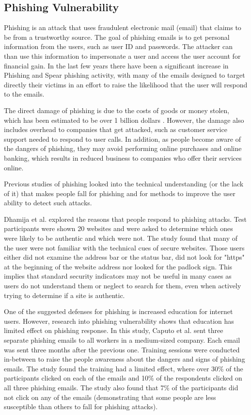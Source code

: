 \documentclass{sig-alternate}
\begin{document}
\subsection{Phishing Vulnerability} 




Phishing is an attack that uses fraudulent electronic mail (email) that claims to be from a trustworthy source.
The goal of phishing emails is to get personal information from the users, such as user ID and passwords. The attacker can than use this information to impersonate a user and access the user account for financial gain. 
In the last few years there have been a significant increase in Phishing and Spear phishing activity, with many of the emails designed to target directly their victims in an effort to raise the likelihood that the user will respond to the emails.

The direct damage of phishing 
is due to
the costs of goods or money stolen,
which has been estimated to be over 1 billion dollars \cite{JM06}. However, the damage 
also
includes overhead to companies that get attacked, such as customer service support needed to respond to user calls. In addition, as people become aware of the dangers of phishing, they may avoid performing online purchases and online banking, which results in reduced business to companies who offer their services online.

Previous studies of phishing looked into the technical understanding (or the lack of it) that makes people fall for phishing and for methods to improve the user ability to detect such attacks.

Dhamija et al. \cite{DTH06}
explored
the reasons that people respond to phishing attacks.
Test participants were shown 20 websites and were asked to determine which ones were likely to be authentic and which were not. The study found that many of the user were not familiar with the technical cues of secure websites. 
Those
users either did not examine the address bar or the status bar, did not look for "https" at the beginning of the website address nor looked for the padlock sign. This implies that standard security indicators may not be useful in many cases as users do not understand them or neglect to search for them, even when actively trying to determine if a site is authentic. 

One of the suggested defenses for phishing is increased education for internet users. However,
research into phishing vulnerability \cite{CAP11} shows that education has limited effect on phishing response. In this study, Caputo et al. sent three separate phishing emails to all workers in a medium-sized company. Each email was sent three months after the previous one. Training sessions were conducted in-between to raise the people awareness about the dangers and signs of phishing emails. The study found the training had a limited effect, where over 30\% of the participants clicked on each of the emails and 10\% of the respondents clicked on all three phishing emails. The study also found that 7\% of the participants did not click on any of the emails (demonstrating that some people are less susceptible than others to fall for phishing attacks).
\end{document}
